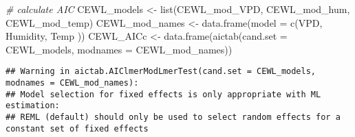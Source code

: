 \documentclass[
]{article}
\newenvironment{Shaded}{\begin{snugshade}}{\end{snugshade}}
\newcommand{\AttributeTok}[1]{\textcolor[rgb]{0.77,0.63,0.00}{#1}}
\newcommand{\CommentTok}[1]{\textcolor[rgb]{0.56,0.35,0.01}{\textit{#1}}}
\newcommand{\FunctionTok}[1]{\textcolor[rgb]{0.00,0.00,0.00}{#1}}
\newcommand{\NormalTok}[1]{#1}
\newcommand{\OtherTok}[1]{\textcolor[rgb]{0.56,0.35,0.01}{#1}}
\newcommand{\StringTok}[1]{\textcolor[rgb]{0.31,0.60,0.02}{#1}}
\begin{document}
\begin{Shaded}
\begin{Highlighting}[]
\CommentTok{\# calculate AIC}
\NormalTok{CEWL\_models }\OtherTok{\textless{}{-}} \FunctionTok{list}\NormalTok{(CEWL\_mod\_VPD, CEWL\_mod\_hum, CEWL\_mod\_temp)}
\NormalTok{CEWL\_mod\_names }\OtherTok{\textless{}{-}} \FunctionTok{data.frame}\NormalTok{(}\AttributeTok{model =} 
                               \FunctionTok{c}\NormalTok{(}\StringTok{\textquotesingle{}VPD\textquotesingle{}}\NormalTok{,}
                                 \StringTok{\textquotesingle{}Humidity\textquotesingle{}}\NormalTok{,}
                                 \StringTok{\textquotesingle{}Temp\textquotesingle{}}
\NormalTok{                                 ))}
\NormalTok{CEWL\_AICc }\OtherTok{\textless{}{-}} \FunctionTok{data.frame}\NormalTok{(}\FunctionTok{aictab}\NormalTok{(}\AttributeTok{cand.set =}\NormalTok{ CEWL\_models, }
                                 \AttributeTok{modnames =}\NormalTok{ CEWL\_mod\_names))}
\end{Highlighting}
\end{Shaded}

\begin{verbatim}
## Warning in aictab.AIClmerModLmerTest(cand.set = CEWL_models, modnames = CEWL_mod_names): 
## Model selection for fixed effects is only appropriate with ML estimation:
## REML (default) should only be used to select random effects for a constant set of fixed effects
\end{verbatim}
\end{document}

